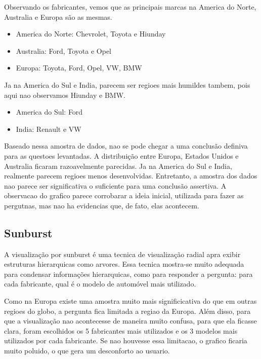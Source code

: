 \documentclass[10pt, conference]{IEEEtran}
\begin{document}
Observando os fabricantes, vemos que as principais marcas na America do Norte, Australia e Europa
são as mesmas.

\begin{itemize}
  \item America do Norte: Chevrolet, Toyota e Hiunday
  \item Australia: Ford, Toyota e Opel
  \item Europa: Toyota, Ford, Opel, VW, BMW
\end{itemize}

Ja na America do Sul e India, parecem ser regioes mais humildes tambem, pois aqui nao observamos
Hiunday e BMW.

\begin{itemize}
  \item America do Sul: Ford
  \item India: Renault e VW
\end{itemize}

Baseado nessa amostra de dados, nao se pode chegar a uma conclusão definiva para as
questoes levantadas. A distribuição entre Europa, Estados Unidos e Australia ficaram razoavelmente
parecidas. Ja na America do Sul e India, realmente parecem regioes menos desenvolvidas. Entretanto,
a amostra dos dados nao parece ser significativa o suficiente para uma conclusão assertiva. A observacao
do grafico parece corrobarar a ideia inicial, utilizada para fazer as pergutnas, mas nao ha evidencias
que, de fato, elas acontecem.



\subsection{Sunburst}

A visualização por sunburst é uma tecnica de visualização radial apra exibir estruturas hierarquicas
como arvores. Essa tecnica mostra-se muito adequada para condensar informações hierarquicas, 
como para responder a pergunta:
para cada fabricante, qual é o modelo de automóvel mais utilizado. 

Como na Europa existe uma amostra muito mais significicativa do que em outras regioes do globo, a
pergunta fica limitada a regiao da Europa. Além disso, para que a visualização nao acontecesse de maneira
muito confusa, para que ela ficasse clara, foram escolhidos os 5 fabricantes mais utilizados e os 3 modelos
mais utilizados por cada fabricante. Se nao houvesse essa limitacao, o grafico ficaria muito poluido, o que
gera um desconforto ao usuario.
\end{document}

